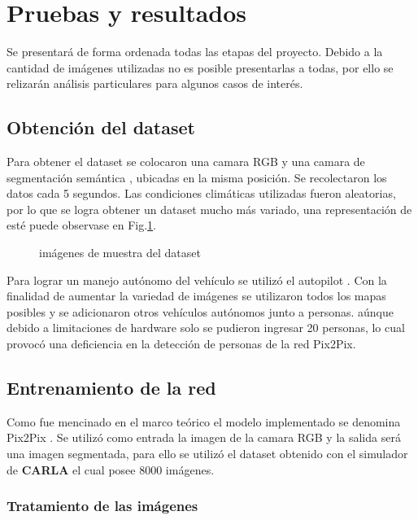 \documentclass[]{IEEEtran}
\begin{document}
    \section{Pruebas y resultados}

    Se presentará de forma ordenada todas las etapas del proyecto. 
    Debido a la cantidad de imágenes utilizadas no es posible presentarlas a todas, por ello 
    se relizarán análisis particulares para algunos casos de interés.

    \subsection{Obtención del dataset}

    Para obtener el dataset se colocaron una camara RGB y una camara de segmentación semántica
    \cite{CARLA-Sensors-Reference}, ubicadas en la misma posición. Se recolectaron los datos 
    cada 5 segundos. Las condiciones climáticas utilizadas fueron aleatorias, por lo que se logra
    obtener un dataset mucho más variado, una representación de esté puede observase en 
    Fig.\ref{fig:dataset}.

    \begin{figure}
        \centering
        \caption{imágenes de muestra del dataset}
        \label{fig:dataset}
    \end{figure}

    Para lograr un manejo autónomo del vehículo se utilizó el autopilot \cite{CARLA-Documentation}. 
    Con la finalidad de aumentar la variedad de imágenes se utilizaron todos los mapas posibles y 
    se adicionaron otros vehículos autónomos junto a personas. aúnque debido 
    a limitaciones de hardware solo se pudieron ingresar 20 personas, lo cual 
    provocó una deficiencia en la detección de personas de la red Pix2Pix. 

    \subsection{Entrenamiento de la red}

    Como fue mencinado en el marco teórico el modelo implementado se denomina Pix2Pix \cite{Pix2Pix}.
    Se utilizó como entrada la imagen de la camara RGB y la salida será una imagen segmentada, para ello se utilizó
    el dataset obtenido con el simulador de \textbf{CARLA} el cual posee 8000 imágenes. 

    \subsubsection{Tratamiento de las imágenes}
\end{document}
